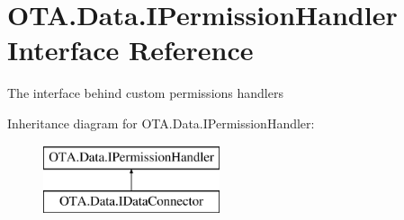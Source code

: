 \hypertarget{interface_o_t_a_1_1_data_1_1_i_permission_handler}{}\section{O\+T\+A.\+Data.\+I\+Permission\+Handler Interface Reference}
\label{interface_o_t_a_1_1_data_1_1_i_permission_handler}


The interface behind custom permissions handlers  


Inheritance diagram for O\+T\+A.\+Data.\+I\+Permission\+Handler\+:\begin{figure}[H]
\begin{center}
\leavevmode
\includegraphics[height=2.000000cm]{interface_o_t_a_1_1_data_1_1_i_permission_handler}
\end{center}
\end{figure}
